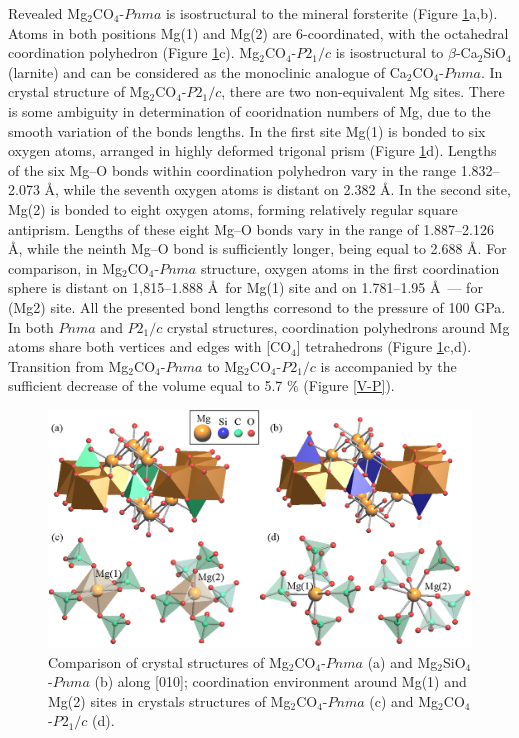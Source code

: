 \documentclass[a4paperm]{article}
\begin{document}
Revealed Mg$_2$CO$_4$-$Pnma$ is isostructural to the mineral forsterite (Figure \ref{str}a,b).
Atoms in both positions Mg(1) and Mg(2) are 6-coordinated, with the octahedral coordination polyhedron (Figure \ref{str}c). 
Mg$_2$CO$_4$-$P2_1/c$ is isostructural to $\beta$-Ca$_2$SiO$_4$ (larnite) and can be considered as the monoclinic analogue of Ca$_2$CO$_4$-$Pnma$.
In crystal structure of Mg$_2$CO$_4$-$P2_1/c$, there are two non-equivalent Mg sites.
There is some ambiguity in determination of cooridnation numbers of Mg, due to the smooth variation of the bonds lengths.
In the first site Mg(1) is bonded to six oxygen atoms, arranged in highly deformed trigonal prism  (Figure \ref{str}d).
Lengths of the six Mg--O bonds within coordination polyhedron vary in the range 1.832--2.073 \AA, while the seventh oxygen atoms is distant on 2.382 \AA.
In the second site, Mg(2) is bonded to eight oxygen atoms, forming relatively regular square antiprism.
Lengths of these eight Mg--O bonds vary in the range of 1.887--2.126 \AA, while the neinth Mg--O bond is sufficiently longer, being equal to 2.688 \AA.
For comparison, in Mg$_2$CO$_4$-$Pnma$ structure, oxygen atoms in the first coordination sphere is distant on 1,815--1.888 \AA\ for Mg(1) site and on 1.781--1.95 \AA\ --- for (Mg2) site.
All the presented bond lengths corresond to the pressure of 100 GPa.
In both $Pnma$ and $P2_1/c$ crystal structures, coordination polyhedrons around Mg atoms share both vertices and edges with [CO$_4$] tetrahedrons (Figure \ref{str}c,d).
Transition from Mg$_2$CO$_4$-$Pnma$ to Mg$_2$CO$_4$-$P2_1/c$ is accompanied by the sufficient decrease of the volume equal to 5.7 \% (Figure \ref{V-P}).

\begin{figure}[H]
	\includegraphics[width=\textwidth]{mg2co4_str} \centering
	\caption{Comparison of crystal structures of Mg$_2$CO$_4$-$Pnma$ (a) and Mg$_2$SiO$_4$-$Pnma$ (b) along [010]; coordination environment around Mg(1) and Mg(2) sites in crystals structures of Mg$_2$CO$_4$-$Pnma$ (c) and Mg$_2$CO$_4$-$P2_1/c$ (d).} 	\label{str}
\end{figure}
\end{document}
